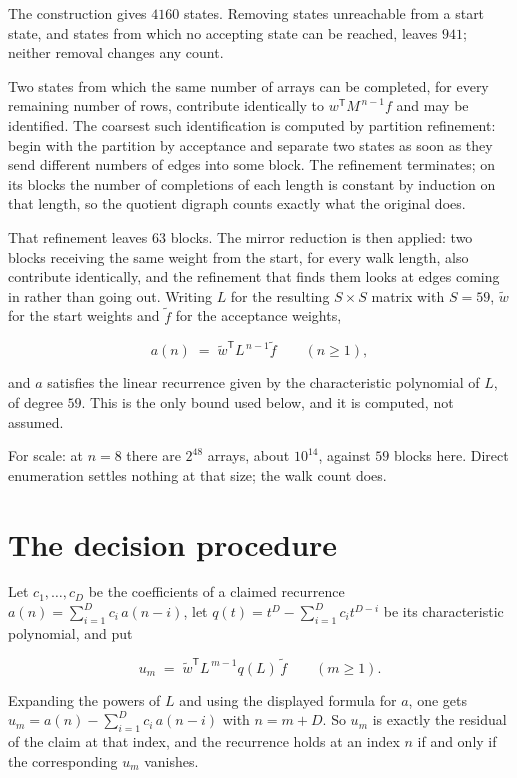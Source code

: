 \documentclass[11pt]{article}
\theoremstyle{definition}
\begin{document}
The construction gives $4160$ states. Removing states unreachable from a start state, and states from which no accepting state can be reached, leaves $941$; neither removal changes any count.

Two states from which the same number of arrays can be completed, for every remaining number of rows, contribute identically to $w^{\mathsf T}M^{\,n-1}f$ and may be identified. The coarsest such identification is computed by partition refinement: begin with the partition by acceptance and separate two states as soon as they send different numbers of edges into some block. The refinement terminates; on its blocks the number of completions of each length is constant by induction on that length, so the quotient digraph counts exactly what the original does.

That refinement leaves $63$ blocks. The mirror reduction is then applied: two blocks receiving the same weight from the start, for every walk length, also contribute identically, and the refinement that finds them looks at edges coming in rather than going out. Writing $L$ for the resulting $S \times S$ matrix with $S = 59$, $\tilde w$ for the start weights and $\tilde f$ for the acceptance weights,

\[a(n) \;=\; \tilde w^{\mathsf T} L^{\,n-1} \tilde f \qquad (n \ge 1),\]

and $a$ satisfies the linear recurrence given by the characteristic polynomial of $L$, of degree $59$. This is the only bound used below, and it is computed, not assumed.

For scale: at $n = 8$ there are $2^{48}$ arrays, about $10^{14}$, against $59$ blocks here. Direct enumeration settles nothing at that size; the walk count does.

\section{The decision procedure}

Let $c_1,\dots,c_D$ be the coefficients of a claimed recurrence $a(n) = \sum_{i=1}^{D} c_i\,a(n-i)$, let $q(t) = t^{D} - \sum_{i=1}^{D} c_i t^{D-i}$ be its characteristic polynomial, and put

\[u_m \;=\; \tilde w^{\mathsf T} L^{\,m-1} q(L)\,\tilde f \qquad (m \ge 1).\]

Expanding the powers of $L$ and using the displayed formula for $a$, one gets $u_m = a(n) - \sum_{i=1}^{D} c_i\,a(n-i)$ with $n = m + D$. So $u_m$ is exactly the residual of the claim at that index, and the recurrence holds at an index $n$ if and only if the corresponding $u_m$ vanishes.
\end{document}
